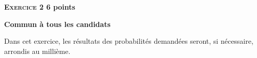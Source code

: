 \textbf{\large\textsc{Exercice 2} \hfill 6 points}

\textbf{Commun à tous les candidats}

\medskip

Dans cet exercice, les résultats des probabilités demandées seront, si nécessaire, arrondis au millième.

%
%
%
%
%
%

\medskip


